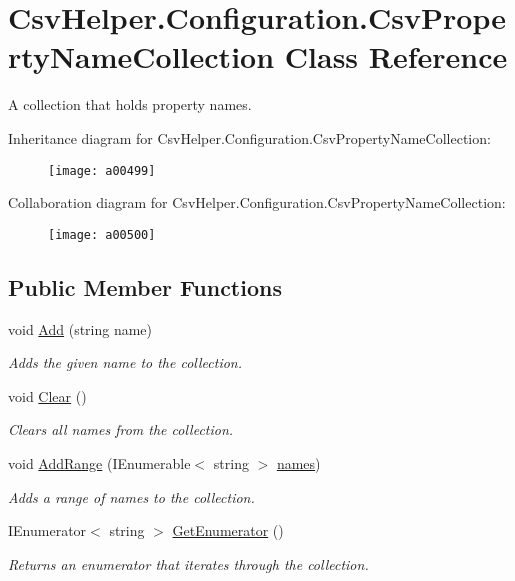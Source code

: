 \hypertarget{a00074}{\section{Csv\-Helper.\-Configuration.\-Csv\-Property\-Name\-Collection Class Reference}
\label{a00074}
}


A collection that holds property names.  




Inheritance diagram for Csv\-Helper.\-Configuration.\-Csv\-Property\-Name\-Collection\-:
\nopagebreak
\begin{figure}[H]
\begin{center}
\leavevmode
\texttt{[image: a00499]}
\end{center}
\end{figure}


Collaboration diagram for Csv\-Helper.\-Configuration.\-Csv\-Property\-Name\-Collection\-:
\nopagebreak
\begin{figure}[H]
\begin{center}
\leavevmode
\texttt{[image: a00500]}
\end{center}
\end{figure}
\subsection*{Public Member Functions}
\begin{DoxyCompactItemize}
\item 
void \hyperlink{a00074_ad7b7d11d5814bcce5ed38e054ef71b4e}{Add} (string name)
\begin{DoxyCompactList}\small\item\em Adds the given name to the collection. \end{DoxyCompactList}\item 
void \hyperlink{a00074_abec990435c8dccfb4553602b89f93201}{Clear} ()
\begin{DoxyCompactList}\small\item\em Clears all names from the collection. \end{DoxyCompactList}\item 
void \hyperlink{a00074_ac568746273968080890abca50b882802}{Add\-Range} (I\-Enumerable$<$ string $>$ \hyperlink{a00074_a41eb6804d8afe8d674e64d71f66962ce}{names})
\begin{DoxyCompactList}\small\item\em Adds a range of names to the collection. \end{DoxyCompactList}\item 
I\-Enumerator$<$ string $>$ \hyperlink{a00074_a61b6a80e51d06f17d0043ec6aef89f1b}{Get\-Enumerator} ()
\begin{DoxyCompactList}\small\item\em Returns an enumerator that iterates through the collection. \end{DoxyCompactList}\end{DoxyCompactItemize}
